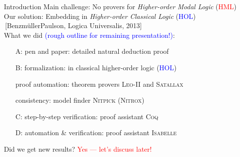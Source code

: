 \begin{frame}{Introduction} \large
Main challenge: \hfill No provers for \emph{Higher-order Modal Logic\/} (\textcolor{red}{HML}) \\[1em]

Our solution: \hfill Embedding in \emph{Higher-order Classical Logic\/} (\textcolor{blue}{HOL}) \\
\,\hfill {\small [Benzm\"ullerPaulson, Logica Universalis, 2013]} \\[2em]

What we did \textcolor{blue}{(rough outline for remaining
  presentation!)}: \\

\begin{itemize}
\item[A:] pen and paper: detailed natural deduction proof 
\item[B:] formalization: in classical higher-order logic (\textcolor{blue}{HOL})
\item[] proof automation: theorem provers \textsc{Leo-II} and \textsc{Satallax} 
\item[] consistency: model finder \textsc{Nitpick (Nitrox)} 
\item[C:] step-by-step verification: proof assistant \textsc{Coq} 
\item[D:] automation \& verification: proof assistant 
  \textsc{Isabelle} \\[2em]
\end{itemize}
Did we get new results? \hfill  \textcolor{red}{Yes --- let's discuss later!}
\end{frame}
